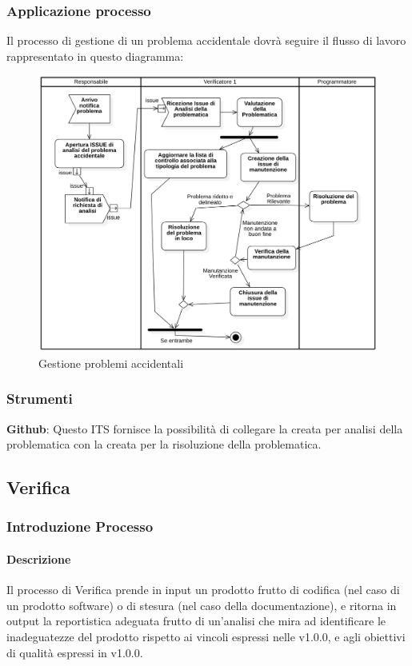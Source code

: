         \subsubsection{Applicazione processo}
            Il processo di gestione di un problema accidentale dovrà seguire il flusso di lavoro rappresentato in questo diagramma:
            \begin{figure}[H]
                    \centering
                    \includegraphics[width=1.0\textwidth]{res/images/gestione_problemi_accidentali.png}
                \caption{Gestione problemi accidentali}
                \label{Gestione problemi accidentali}
            \end{figure}
        \subsubsection{Strumenti}
            \textbf{Github}: Questo ITS fornisce la possibilità di collegare la  creata per analisi della problematica con la  creata per la risoluzione della problematica.

    \subsection{Verifica}
        \subsubsection{Introduzione Processo}
            \paragraph{Descrizione}
                Il processo di Verifica prende in input un prodotto frutto di codifica (nel caso di un prodotto software) o di stesura (nel caso della documentazione), e ritorna in output la reportistica adeguata frutto di un’analisi che mira ad identificare le inadeguatezze del prodotto rispetto ai vincoli espressi nelle  v1.0.0, e agli obiettivi di qualità espressi in  v1.0.0. 
